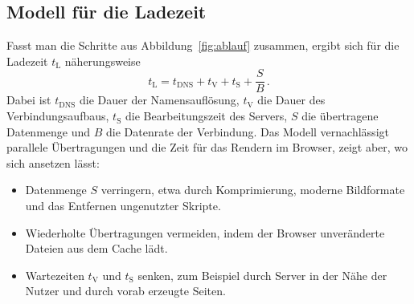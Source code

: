 \subsection{Modell für die Ladezeit}
\label{sec:modell}

Fasst man die Schritte aus Abbildung~\ref{fig:ablauf} zusammen, ergibt sich
für die Ladezeit $t_\mathrm{L}$ näherungsweise
\begin{equation}
  t_\mathrm{L} = t_\mathrm{DNS} + t_\mathrm{V} + t_\mathrm{S} + \frac{S}{B}\,.
  \label{eq:ladezeit}
\end{equation}
Dabei ist $t_\mathrm{DNS}$ die Dauer der Namensauflösung, $t_\mathrm{V}$ die
Dauer des Verbindungsaufbaus, $t_\mathrm{S}$ die Bearbeitungszeit des Servers,
$S$ die übertragene Datenmenge und $B$ die Datenrate der Verbindung. Das
Modell vernachlässigt parallele Übertragungen und die Zeit für das Rendern im
Browser, zeigt aber, wo sich ansetzen lässt:
\begin{itemize}
  \item Datenmenge $S$ verringern, etwa durch Komprimierung, moderne
        Bildformate und das Entfernen ungenutzter Skripte.
  \item Wiederholte Übertragungen vermeiden, indem der Browser unveränderte
        Dateien aus dem Cache lädt.
  \item Wartezeiten $t_\mathrm{V}$ und $t_\mathrm{S}$ senken, zum Beispiel
        durch Server in der Nähe der Nutzer und durch vorab erzeugte Seiten.
\end{itemize}
